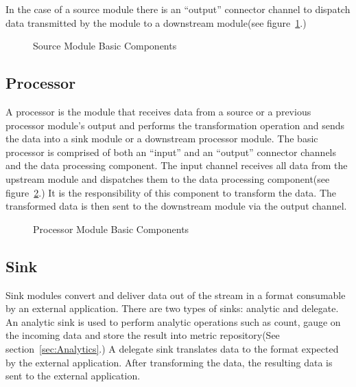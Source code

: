 \par

In the case of a source module there is an ``output'' connector channel to dispatch data
transmitted by the module to a downstream module(see figure~\ref{fig:sourcembc}.)

\par

\begin{figure}[ht]
\centering
{}
\caption{Source Module Basic Components}
\label{fig:sourcembc}
\end{figure}

\par

\subsection{Processor}
A processor is the module that receives data from a source or a previous processor
module's output and performs the transformation operation and sends the data
into a sink module or a downstream processor module. The basic processor is
comprised of both an ``input'' and an ``output'' connector channels and the data processing component.
The input channel receives all data from the upstream module and dispatches them to
the data processing component(see figure~\ref{fig:processormbc}.) It is the responsibility of
this component to transform the data. The transformed data is then sent to the downstream module
via the output channel.

\par

\begin{figure}
\centering
{}
\caption{Processor Module Basic Components}
\label{fig:processormbc}
\end{figure}

\par

\subsection{Sink}
Sink modules convert and deliver data out of the stream in a format consumable by
an external application.  There are two types of sinks: analytic and delegate.
An analytic sink is used to perform analytic operations such as count, gauge on the
incoming data and store the result into metric repository(See section~\ref{sec:Analytics}.)
A delegate sink translates data to the format expected by the external application.
After transforming the data, the resulting data is sent to the external application.

